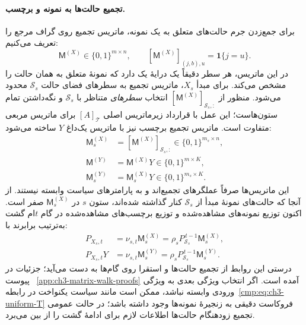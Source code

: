 \paragraph{تجمیع حالت‌ها به نمونه و برچسب.}
برای جمع‌زدن جرم حالت‌های متعلق به
یک نمونه، ماتریس تجمیع روی گراف مرجع
را تعریف می‌کنیم:
\[
\mathsf M^{(X)}\in\{0,1\}^{m\times n},
\qquad
[\mathsf M^{(X)}]_{(j,b),u}=\mathbf1\{j=u\}.
\]
در این ماتریس، هر سطر دقیقاً یک درایهٔ
یک دارد که نمونهٔ متعلق به همان حالت
را مشخص می‌کند. برای مبدأ $X_s$،
ماتریس تجمیع به سطرهای فضای حالت
$\mathcal S_s$ محدود می‌شود. منظور از
$[\mathsf M^{(X)}]_{\mathcal S_s,:}$
انتخاب \emph{سطرهای} متناظر با
$\mathcal S_s$ و نگه‌داشتن تمام ستون‌هاست؛
این عمل با قرارداد زیرماتریس اصلی
$[A]_{\mathcal T}$ برای ماتریس مربعی
متفاوت است. ماتریس تجمیع برچسب
نیز با ماتریس یک‌داغ $Y$ ساخته می‌شود:
\begin{equation}\label{cmp:eq:ch3-state-aggregation-matrices}
\boxed{
\begin{aligned}
\mathsf M_s^{(X)}
&=[\mathsf M^{(X)}]_{\mathcal S_s,:}
\in\{0,1\}^{m_s\times n},\\
\mathsf M^{(Y)}
&=\mathsf M^{(X)}Y
\in\{0,1\}^{m\times K},\\
\mathsf M_s^{(Y)}
&=\mathsf M_s^{(X)}Y
\in\{0,1\}^{m_s\times K}.
\end{aligned}
}
\end{equation}
این ماتریس‌ها صرفاً عملگرهای تجمیع‌اند
و به پارامترهای سیاست وابسته نیستند.
از آنجا که حالت‌های نمونهٔ مبدأ از
$\mathcal S_s$ کنار گذاشته شده‌اند،
ستون $s$ در $\mathsf M_s^{(X)}$ صفر است.
اکنون توزیع نمونه‌های مشاهده‌شده و
توزیع برچسب‌های مشاهده‌شده در گام
$t$ام گشت به‌ترتیب برابرند با:
\begin{equation}\label{cmp:eq:ch3-block-t-step}
\boxed{
\begin{aligned}
P_{X_s,t}
&=\nu_{s,t}\mathsf M_s^{(X)}
=\rho_sP_{\mathcal S_s}^{\,t-1}\mathsf M_s^{(X)},\\
P_{X_s,t}Y
&=\nu_{s,t}\mathsf M_s^{(Y)}
=\rho_sP_{\mathcal S_s}^{\,t-1}\mathsf M_s^{(Y)}.
\end{aligned}
}
\end{equation}
درستی این روابط از تجمیع حالت‌ها
و استقرا روی گام‌ها به دست می‌آید؛
جزئیات در پیوست~
\ref{app:ch3-matrix-walk-proofs} آمده است.
اگر انتخاب ویژگی بعدی به ویژگی ورودی
وابسته نباشد، ممکن است مانند سیاست
یکنواخت در رابطه~\eqref{cmp:eq:ch3-uniform-T}
فروکاست دقیقی به زنجیرهٔ نمونه‌ها وجود
داشته باشد؛ در حالت عمومی تجمیع زودهنگام
حالت‌ها اطلاعات لازم برای ادامهٔ گشت
را از بین می‌برد.

